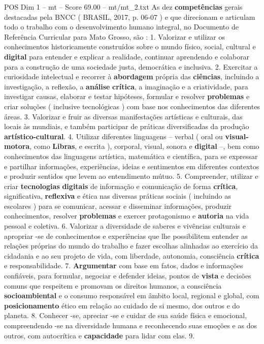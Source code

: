 \begin{textsample}{POS Dim 1 – mt – Score 69.00 – mt/mt\_2.txt}
As dez \textbf{competências} gerais destacadas pela BNCC ( BRASIL, 2017, p. 06-07 ) e que direcionam e articulam todo o trabalho com o desenvolvimento humano integral, no Documento de Referência Curricular para Mato Grosso, são : 1.
Valorizar e utilizar os conhecimentos historicamente construídos sobre o mundo físico, social, cultural e \textbf{digital} para entender e explicar a realidade, continuar aprendendo e colaborar para a construção de uma sociedade justa, democrática e inclusiva. 2.
Exercitar a curiosidade intelectual e recorrer à \textbf{abordagem} própria das \textbf{ciências}, incluindo a investigação, a reflexão, a \textbf{análise} \textbf{crítica}, a imaginação e a criatividade, para investigar causas, elaborar e testar hipóteses, formular e resolver \textbf{problemas} e criar soluções ( inclusive tecnológicas ) com base nos conhecimentos das diferentes áreas. 3.
Valorizar e fruir as diversas manifestações artísticas e culturais, das locais às mundiais, e também participar de práticas diversificadas da produção \textbf{artístico-cultural}. 4.
Utilizar diferentes linguagens – verbal ( oral ou \textbf{visual-motora}, como \textbf{Libras}, e escrita ), corporal, visual, sonora e \textbf{digital} –, bem como conhecimentos das linguagens artística, matemática e científica, para se expressar e partilhar informações, experiências, ideias e sentimentos em diferentes contextos e produzir sentidos que levem ao entendimento mútuo. 5.
Compreender, utilizar e criar \textbf{tecnologias} \textbf{digitais} de informação e comunicação de forma \textbf{crítica}, significativa, \textbf{reflexiva} e ética nas diversas práticas sociais ( incluindo as escolares ) para se comunicar, acessar e disseminar informações, produzir conhecimentos, resolver \textbf{problemas} e exercer protagonismo e \textbf{autoria} na vida pessoal e coletiva. 6.
Valorizar a diversidade de saberes e vivências culturais e apropriar -se de conhecimentos e experiências que lhe possibilitem entender as relações próprias do mundo do trabalho e fazer escolhas alinhadas ao exercício da cidadania e ao seu projeto de vida, com liberdade, autonomia, consciência \textbf{crítica} e responsabilidade. 7. \textbf{Argumentar} com base em fatos, dados e informações confiáveis, para formular, negociar e defender ideias, pontos de \textbf{vista} e decisões comuns que respeitem e promovam os direitos humanos, a consciência \textbf{socioambiental} e o consumo responsável em âmbito local, regional e global, com \textbf{posicionamento} ético em relação ao cuidado de si mesmo, dos outros e do planeta. 8.
Conhecer -se, apreciar -se e cuidar de sua saúde física e emocional, compreendendo -se na diversidade humana e reconhecendo suas emoções e as dos outros, com autocrítica e \textbf{capacidade} para lidar com elas. 9.

\end{textsample}
